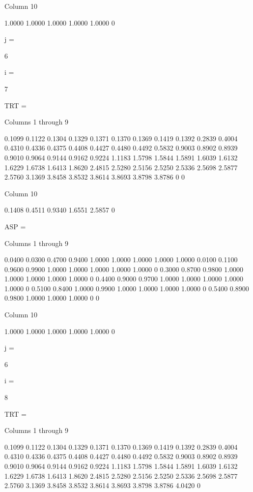   Column 10

    1.0000
    1.0000
    1.0000
    1.0000
    1.0000
         0


j =

     6


i =

     7


TRT =

  Columns 1 through 9

    0.1099    0.1122    0.1304    0.1329    0.1371    0.1370    0.1369    0.1419    0.1392
    0.2839    0.4004    0.4310    0.4336    0.4375    0.4408    0.4427    0.4480    0.4492
    0.5832    0.9003    0.8902    0.8939    0.9010    0.9064    0.9144    0.9162    0.9224
    1.1183    1.5798    1.5844    1.5891    1.6039    1.6132    1.6229    1.6738    1.6413
    1.8620    2.4815    2.5280    2.5156    2.5250    2.5336    2.5698    2.5877    2.5760
    3.1369    3.8458    3.8532    3.8614    3.8693    3.8798    3.8786         0         0

  Column 10

    0.1408
    0.4511
    0.9340
    1.6551
    2.5857
         0


ASP =

  Columns 1 through 9

    0.0400    0.0300    0.4700    0.9400    1.0000    1.0000    1.0000    1.0000    1.0000
    0.0100    0.1100    0.9600    0.9900    1.0000    1.0000    1.0000    1.0000    1.0000
         0    0.3000    0.8700    0.9800    1.0000    1.0000    1.0000    1.0000    1.0000
         0    0.4400    0.9000    0.9700    1.0000    1.0000    1.0000    1.0000    1.0000
         0    0.5100    0.8400    1.0000    0.9900    1.0000    1.0000    1.0000    1.0000
         0    0.5400    0.8900    0.9800    1.0000    1.0000    1.0000         0         0

  Column 10

    1.0000
    1.0000
    1.0000
    1.0000
    1.0000
         0


j =

     6


i =

     8


TRT =

  Columns 1 through 9

    0.1099    0.1122    0.1304    0.1329    0.1371    0.1370    0.1369    0.1419    0.1392
    0.2839    0.4004    0.4310    0.4336    0.4375    0.4408    0.4427    0.4480    0.4492
    0.5832    0.9003    0.8902    0.8939    0.9010    0.9064    0.9144    0.9162    0.9224
    1.1183    1.5798    1.5844    1.5891    1.6039    1.6132    1.6229    1.6738    1.6413
    1.8620    2.4815    2.5280    2.5156    2.5250    2.5336    2.5698    2.5877    2.5760
    3.1369    3.8458    3.8532    3.8614    3.8693    3.8798    3.8786    4.0420         0

